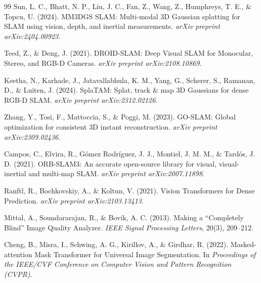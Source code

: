 \documentclass[12pt,a4paper,onecolumn]{article}
\begin{document}
\begin{thebibliography}{99}
Sun, L. C., Bhatt, N. P., Liu, J. C., Fan, Z., Wang, Z., Humphreys, T. E., \& Topcu, U. (2024).
\newblock MM3DGS SLAM: Multi-modal 3D Gaussian splatting for SLAM using vision, depth, and inertial measurements.
\newblock \emph{arXiv preprint arXiv:2404.00923}.

Teed, Z., \& Deng, J. (2021).
\newblock DROID-SLAM: Deep Visual SLAM for Monocular, Stereo, and RGB-D Cameras.
\newblock \emph{arXiv preprint arXiv:2108.10869}.

Keetha, N., Karhade, J., Jatavallabhula, K. M., Yang, G., Scherer, S., Ramanan, D., \& Luiten, J. (2024).
\newblock SplaTAM: Splat, track \& map 3D Gaussians for dense RGB-D SLAM.
\newblock \emph{arXiv preprint arXiv:2312.02126}.

Zhang, Y., Tosi, F., Mattoccia, S., \& Poggi, M. (2023).
\newblock GO-SLAM: Global optimization for consistent 3D instant reconstruction.
\newblock \emph{arXiv preprint arXiv:2309.02436}.

Campos, C., Elvira, R., Gómez Rodríguez, J. J., Montiel, J. M. M., \& Tardós, J. D. (2021).
\newblock ORB-SLAM3: An accurate open-source library for visual, visual-inertial and multi-map SLAM.
\newblock \emph{arXiv preprint arXiv:2007.11898}.

Ranftl, R., Bochkovskiy, A., \& Koltun, V. (2021).
\newblock Vision Transformers for Dense Prediction.
\newblock \emph{arXiv preprint arXiv:2103.13413}.

Mittal, A., Soundararajan, R., \& Bovik, A. C. (2013).
\newblock Making a ``Completely Blind'' Image Quality Analyzer.
\newblock \emph{IEEE Signal Processing Letters}, 20(3), 209--212.

Cheng, B., Misra, I., Schwing, A. G., Kirillov, A., \& Girdhar, R. (2022).
\newblock Masked-attention Mask Transformer for Universal Image Segmentation.
\newblock In \emph{Proceedings of the IEEE/CVF Conference on Computer Vision and Pattern Recognition (CVPR)}.

\end{thebibliography}
\end{document}
